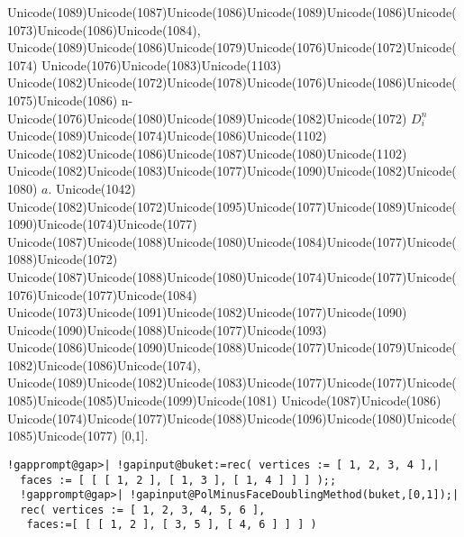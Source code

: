 \documentclass[a4paper,11pt]{report}
\begin{document}
{{{Unicode(1089)Unicode(1087)Unicode(1086)Unicode(1089)Unicode(1086)Unicode(1073)Unicode(1086)Unicode(1084),
Unicode(1089)Unicode(1086)Unicode(1079)Unicode(1076)Unicode(1072)Unicode(1074)
Unicode(1076)Unicode(1083)Unicode(1103)
Unicode(1082)Unicode(1072)Unicode(1078)Unicode(1076)Unicode(1086)Unicode(1075)Unicode(1086)
n-Unicode(1076)Unicode(1080)Unicode(1089)Unicode(1082)Unicode(1072) $D^n_i$ Unicode(1089)Unicode(1074)Unicode(1086)Unicode(1102)
Unicode(1082)Unicode(1086)Unicode(1087)Unicode(1080)Unicode(1102)
Unicode(1082)Unicode(1083)Unicode(1077)Unicode(1090)Unicode(1082)Unicode(1080) $a.$ Unicode(1042)
Unicode(1082)Unicode(1072)Unicode(1095)Unicode(1077)Unicode(1089)Unicode(1090)Unicode(1074)Unicode(1077)
Unicode(1087)Unicode(1088)Unicode(1080)Unicode(1084)Unicode(1077)Unicode(1088)Unicode(1072)
Unicode(1087)Unicode(1088)Unicode(1080)Unicode(1074)Unicode(1077)Unicode(1076)Unicode(1077)Unicode(1084)
Unicode(1073)Unicode(1091)Unicode(1082)Unicode(1077)Unicode(1090)
Unicode(1090)Unicode(1088)Unicode(1077)Unicode(1093)
Unicode(1086)Unicode(1090)Unicode(1088)Unicode(1077)Unicode(1079)Unicode(1082)Unicode(1086)Unicode(1074),
Unicode(1089)Unicode(1082)Unicode(1083)Unicode(1077)Unicode(1077)Unicode(1085)Unicode(1085)Unicode(1099)Unicode(1081)
Unicode(1087)Unicode(1086)
Unicode(1074)Unicode(1077)Unicode(1088)Unicode(1096)Unicode(1080)Unicode(1085)Unicode(1077)
[0,1]. 
\begin{Verbatim}[commandchars=!@|,fontsize=\small,frame=single,label=Пример]
  !gapprompt@gap>| !gapinput@buket:=rec( vertices := [ 1, 2, 3, 4 ],|
  faces := [ [ [ 1, 2 ], [ 1, 3 ], [ 1, 4 ] ] ] );;
  !gapprompt@gap>| !gapinput@PolMinusFaceDoublingMethod(buket,[0,1]);|
  rec( vertices := [ 1, 2, 3, 4, 5, 6 ],
   faces:=[ [ [ 1, 2 ], [ 3, 5 ], [ 4, 6 ] ] ] )
  					

\end{Verbatim}}}}
\end{document}
